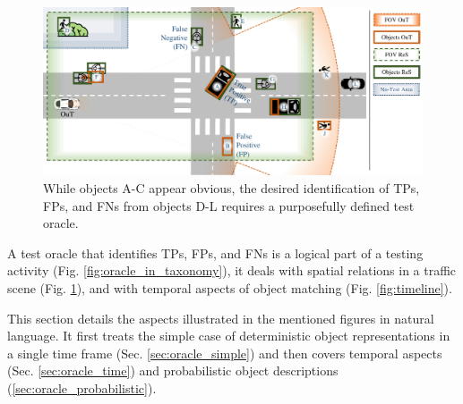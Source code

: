 \documentclass[conference]{IEEEtran}
\begin{document}
\begin{figure}[t]
	\centering
	\vspace*{2mm}
	\includegraphics[width=\textwidth]{img/top_down_fitting_slide.pdf}
	
	\caption{ While objects A-C appear obvious, the desired identification of TPs, FPs, and FNs from objects D-L requires a purposefully defined test oracle. 
	}
	\label{fig:top_down_all}
\end{figure}


A test oracle that identifies TPs, FPs, and FNs is a logical part of a testing activity (Fig. \ref{fig:oracle_in_taxonomy}), it deals with spatial relations in a traffic scene (Fig. \ref{fig:top_down_all}), and with temporal aspects of object matching (Fig. \ref{fig:timeline}).

This section details the aspects illustrated in the mentioned figures in natural language. 
It first treats the simple case of deterministic object representations in a single time frame (Sec. \ref{sec:oracle_simple}) and then covers temporal aspects (Sec. \ref{sec:oracle_time}) and probabilistic object descriptions (\ref{sec:oracle_probabilistic}).

\end{document}

